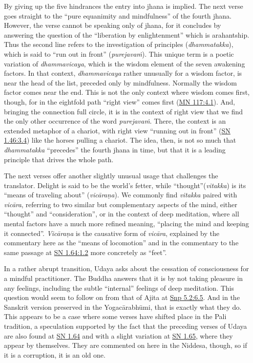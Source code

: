 \documentclass[12pt,openany]{book}%
\begin{document}
By giving up the five hindrances the entry into jhana is implied. The next verse goes straight to the “pure equanimity and mindfulness” of the fourth jhana. However, the verse cannot be speaking only of jhana, for it concludes by answering the question of the “liberation by enlightenment” which is arahantship. Thus the second line refers to the investigation of principles (\textit{dhammatakka}), which is said to “run out in front” (\textit{\textsanskrit{purejavaṁ}}). This unique term is a poetic variation of \textit{dhammavicaya}, which is the wisdom element of the seven awakening factors. In that context, \textit{dhammavicaya} rather unusually for a wisdom factor, is near the head of the list, preceded only by mindfulness. Normally the wisdom factor comes near the end. This is not the only context where wisdom comes first, though, for in the eightfold path “right view” comes first (\href{https://suttacentral.net/mn117/en/sujato\#4.1}{MN 117:4.1}). And, bringing the connection full circle, it is in the context of right view that we find the only other occurrence of the word \textit{\textsanskrit{purejavaṁ}}. There, the context is an extended metaphor of a chariot, with right view “running out in front” (\href{https://suttacentral.net/sn1.46/en/sujato\#3.4}{SN 1.46:3.4}) like the horses pulling a chariot. The idea, then, is not so much that \textit{dhammatakka} “precedes” the fourth jhana in time, but that it is a leading principle that drives the whole path.

The next verses offer another slightly unusual usage that challenges the translator. Delight is said to be the world’s fetter, while “thought”(\textit{vitakka}) is its “means of traveling about” (\textit{\textsanskrit{vicāraṇa}}). We commonly find \textit{vitakka} paired with \textit{\textsanskrit{vicāra}}, referring to two similar but complementary aspects of the mind, either “thought” and “consideration”, or in the context of deep meditation, where all mental factors have a much more refined meaning, “placing the mind and keeping it connected”. \textit{\textsanskrit{Vicāraṇa}} is the causative form of \textit{\textsanskrit{vicāra}}, explained by the commentary here as the “means of locomotion” and in the commentary to the same passage at \href{https://suttacentral.net/sn1.64/en/sujato\#1.2}{SN 1.64:1.2} more concretely as “feet”.

In a rather abrupt transition, Udaya asks about the cessation of consciousness for a mindful practitioner. The Buddha answers that it is by not taking pleasure in any feelings, including the subtle “internal” feelings of deep meditation. This question would seem to follow on from that of Ajita at \href{https://suttacentral.net/snp5.2/en/sujato\#6.5}{Snp 5.2:6.5}. And in the Sanskrit version preserved in the \textsanskrit{Yogacārabhūmi}, that is exactly what they do. This appears to be a case where some verses have shifted place in the Pali tradition, a speculation supported by the fact that the preceding verses of Udaya are also found at \href{https://suttacentral.net/sn1.64/en/sujato}{SN 1.64} and with a slight variation at \href{https://suttacentral.net/sn1.65/en/sujato}{SN 1.65}, where they appear by themselves. They are commented on here in the Niddesa, though, so if it is a corruption, it is an old one.
\end{document}
